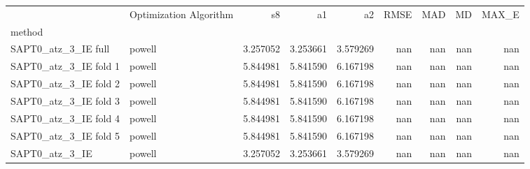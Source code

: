\begin{tabular}{llrrrrrrr}
 & Optimization Algorithm & s8 & a1 & a2 & RMSE & MAD & MD & MAX_E \\
method &  &  &  &  &  &  &  &  \\
SAPT0_atz_3_IE full & powell & 3.257052 & 3.253661 & 3.579269 & nan & nan & nan & nan \\
SAPT0_atz_3_IE fold 1 & powell & 5.844981 & 5.841590 & 6.167198 & nan & nan & nan & nan \\
SAPT0_atz_3_IE fold 2 & powell & 5.844981 & 5.841590 & 6.167198 & nan & nan & nan & nan \\
SAPT0_atz_3_IE fold 3 & powell & 5.844981 & 5.841590 & 6.167198 & nan & nan & nan & nan \\
SAPT0_atz_3_IE fold 4 & powell & 5.844981 & 5.841590 & 6.167198 & nan & nan & nan & nan \\
SAPT0_atz_3_IE fold 5 & powell & 5.844981 & 5.841590 & 6.167198 & nan & nan & nan & nan \\
SAPT0_atz_3_IE & powell & 3.257052 & 3.253661 & 3.579269 & nan & nan & nan & nan \\
\end{tabular}
